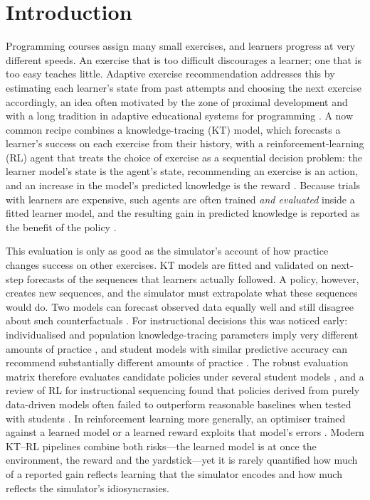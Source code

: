 \section{Introduction}\label{sec:intro}

Programming courses assign many small exercises, and learners progress at very different speeds. An exercise that is too difficult discourages a learner; one that is too easy teaches little. Adaptive exercise recommendation addresses this by estimating each learner's state from past attempts and choosing the next exercise accordingly, an idea often motivated by the zone of proximal development \citep{vygotsky1978mind} and with a long tradition in adaptive educational systems for programming \citep{brusilovsky2007user,hsiao2010guiding}. A now common recipe combines a knowledge-tracing (KT) model, which forecasts a learner's success on each exercise from their history, with a reinforcement-learning (RL) agent that treats the choice of exercise as a sequential decision problem: the learner model's state is the agent's state, recommending an exercise is an action, and an increase in the model's predicted knowledge is the reward \citep{huang2019dre,liu2019cseal,ai2019cdkt,chen2023src,li2023gehrl,ozyurt2025exrec}. Because trials with learners are expensive, such agents are often trained \emph{and evaluated} inside a fitted learner model, and the resulting gain in predicted knowledge is reported as the benefit of the policy \citep{cheng2026unier}.

This evaluation is only as good as the simulator's account of how practice changes success on other exercises. KT models are fitted and validated on next-step forecasts of the sequences that learners actually followed. A policy, however, creates new sequences, and the simulator must extrapolate what these sequences would do. Two models can forecast observed data equally well and still disagree about such counterfactuals \citep{breiman2001two,damour2022underspecification}. For instructional decisions this was noticed early: individualised and population knowledge-tracing parameters imply very different amounts of practice \citep{lee2012individualizing}, and student models with similar predictive accuracy can recommend substantially different amounts of practice \citep{rollinson2015predictive}. The robust evaluation matrix therefore evaluates candidate policies under several student models \citep{doroudi2017rem}, and a review of RL for instructional sequencing found that policies derived from purely data-driven models often failed to outperform reasonable baselines when tested with students \citep{doroudi2019reward}. In reinforcement learning more generally, an optimiser trained against a learned model or a learned reward exploits that model's errors \citep{kurutach2018metrpo,janner2019trust,gao2023scaling}. Modern KT--RL pipelines combine both risks---the learned model is at once the environment, the reward and the yardstick---yet it is rarely quantified how much of a reported gain reflects learning that the simulator encodes and how much reflects the simulator's idiosyncrasies.

